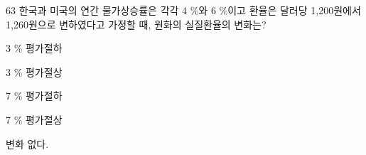 \begin{question}{63}
한국과 미국의 연간 물가상승률은 각각 4 \%와 6 \%이고 환율은 달러당 1,200원에서 1,260원으로 변하였다고 가정할 때, 원화의 실질환율의 변화는?
\begin{choices}
  \item 3 \% 평가절하
  \item 3 \% 평가절상
  \item 7 \% 평가절하
  \item 7 \% 평가절상
  \item 변화 없다.
\end{choices}
\end{question}
